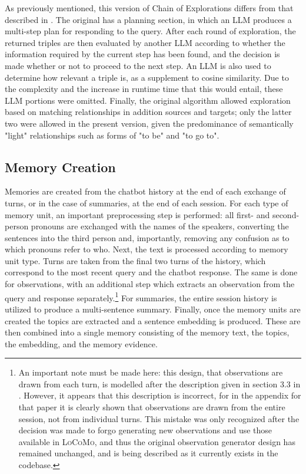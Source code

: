 As previously mentioned, this version of Chain of Explorations differs from that described in \cite{Sanmartin2024}. The original has a planning section, in which an LLM produces a multi-step plan for responding to the query. After each round of exploration, the returned triples are then evaluated by another LLM according to whether the information required by the current step has been found, and the decision is made whether or not to proceed to the next step. An LLM is also used to determine how relevant a triple is, as a supplement to cosine similarity. Due to the complexity and the increase in runtime time that this would entail, these LLM portions were omitted. Finally, the original algorithm allowed exploration based on matching relationships in addition sources and targets; only the latter two were allowed in the present version, given the predominance of semantically "light" relationships such as forms of "to be" and "to go to".



\subsection{Memory Creation}

Memories are created from the chatbot history at the end of each exchange of turns, or in the case of summaries, at the end of each session. For each type of memory unit, an important preprocessing step is performed: all first- and second-person pronouns are exchanged with the names of the speakers, converting the sentences into the third person and, importantly, removing any confusion as to which pronouns refer to who. Next, the text is processed according to memory unit type. Turns are taken from the final two turns of the history, which correspond to the most recent query and the chatbot response. The same is done for observations, with an additional step which extracts an observation from the query and response separately.\footnote{An important note must be made here: this design, that observations are drawn from each turn, is modelled after the description given in section 3.3 in \cite{Maharana2024}. However, it appears that this description is incorrect, for in the appendix for that paper it is clearly shown that observations are drawn from the entire session, not from individual turns. This mistake was only recognized after the decision was made to forgo generating new observations and use those available in \textsc{LoCoMo}, and thus the original observation generator design has remained unchanged, and is being described as it currently exists in the codebase.} For summaries, the entire session history is utilized to produce a multi-sentence summary. Finally, once the memory units are created the topics are extracted and a sentence embedding is produced. These are then combined into a single memory consisting of the memory text, the topics, the embedding, and the memory evidence.



